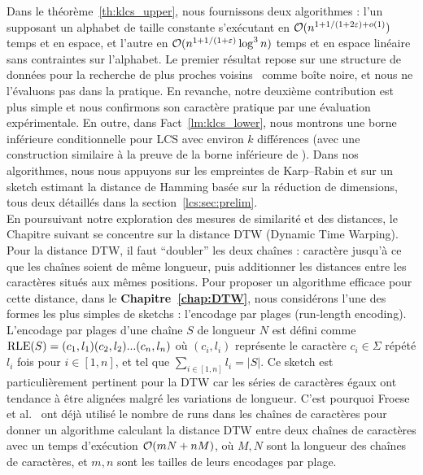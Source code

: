 Dans le théorème~\ref{th:klcs_upper}, nous fournissons deux algorithmes : l'un supposant un alphabet de taille constante s'exécutant en $\mathcal{O}(n^{1+ 1/(1+2\varepsilon) + o(1)})$ temps et en espace, et l'autre en $\mathcal{O}(n^{1+1/(1+\varepsilon)} \log^3 n)$ temps et en espace linéaire sans contraintes sur l'alphabet. Le premier résultat repose sur une structure de données pour la recherche de plus proches voisins~\cite{DBLP:conf/stoc/AndoniR15} comme boîte noire, et nous ne l'évaluons pas dans la pratique. En revanche, notre deuxième contribution est plus simple et nous confirmons son caractère pratique par une évaluation expérimentale.
En outre, dans Fact~\ref{lm:klcs_lower}, nous montrons une borne inférieure conditionnelle pour LCS avec environ $k$ différences (avec une construction similaire à la preuve de la borne inférieure de \kLCS ).
Dans nos algorithmes, nous nous appuyons sur les empreintes de Karp--Rabin et sur un sketch estimant la distance de Hamming basée sur la réduction de dimensions, tous deux détaillés dans la section~\ref{lcs:sec:prelim}. \\


En poursuivant notre exploration des mesures de similarité et des distances, le Chapitre suivant se concentre sur la distance DTW (Dynamic Time Warping). Pour la distance DTW, il faut ``doubler'' les deux chaînes : caractère jusqu'à ce que les chaînes soient de même longueur, puis additionner les distances entre les caractères situés aux mêmes positions.
Pour proposer un algorithme efficace pour cette distance, dans le \textbf{Chapitre~\ref{chap:DTW}}, nous considérons l'une des formes les plus simples de sketchs : l'encodage par plages (run-length encoding). L'encodage par plages d'une chaîne $S$ de longueur $N$ est défini comme $\mathrm{RLE}(S)=(c_1,l_1)(c_2,l_2)... (c_n,l_n)$ où $(c_i,l_i)$ représente le caractère $c_i \in \Sigma$ répété $l_i$ fois pour $i \in [1,n]$, et tel que $\sum_{i\in [1,n]} l_i = |S|$.
Ce sketch est particulièrement pertinent pour la DTW car les séries de caractères égaux ont tendance à être alignées malgré les variations de longueur. C'est pourquoi Froese et al.~\cite{DBLP:journals/corr/abs-1903-03003} ont déjà utilisé le nombre de runs dans les chaînes de caractères pour donner un algorithme calculant la distance DTW entre deux chaînes de caractères avec un temps d'exécution $\mathcal{O}(mN+nM)$, où $M,N$ sont la longueur des chaînes de caractères, et $m, n$ sont les tailles de leurs encodages par plage.

